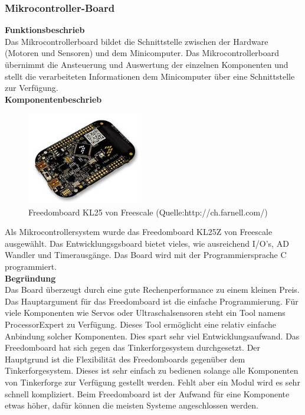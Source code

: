 \subsubsection{Mikrocontroller-Board}
\textbf{Funktionsbeschrieb}\\[0.2cm]
Das Mikrocontrollerboard bildet die Schnittstelle zwischen der Hardware (Motoren und Sensoren) und dem Minicomputer. Das Mikrocontrollerboard übernimmt die Ansteuerung und Auswertung der einzelnen Komponenten und stellt die verarbeiteten Informationen dem Minicomputer über eine Schnittstelle zur Verfügung.\\[0.2cm]
\newpage
\textbf{Komponentenbeschrieb}
\begin{figure}[H]
	\centering
	\includegraphics[width=0.45\textwidth]{03_Loesungskonzept/pictures/freedomboard.png}
	\caption{Freedomboard KL25 von Freescale (Quelle:http://ch.farnell.com/)}
\end{figure}
Als Mikrocontrollersystem wurde das Freedomboard KL25Z von Freescale ausgewählt. Das Entwicklungsgsboard bietet vieles, wie ausreichend I/O's, AD Wandler und Timerausgänge. Das Board wird mit der Programmiersprache C programmiert.\\[0.2cm]
\textbf{Begründung}\\[0.2cm]
Das Board überzeugt durch eine gute Rechenperformance zu einem kleinen Preis. Das Hauptargument für das Freedomboard ist die einfache Programmierung. Für viele Komponenten wie Servos oder Ultraschalsensoren steht ein Tool namens ProcessorExpert zu Verfügung. Dieses Tool ermöglicht eine relativ einfache Anbindung solcher Komponenten. Dies spart sehr viel Entwicklungsaufwand.
Das Freedomboard hat sich gegen das Tinkerforgesystem durchgesetzt. Der Hauptgrund ist die Flexibilität des Freedomboards gegenüber dem Tinkerforgesystem. Dieses ist sehr einfach zu bedienen solange alle Komponenten von Tinkerforge zur Verfügung gestellt werden. Fehlt aber ein Modul wird es sehr schnell kompliziert. Beim Freedomboard ist der Aufwand für eine Komponente etwas höher, dafür können die meisten Systeme angeschlossen werden.\\[0.2cm]
